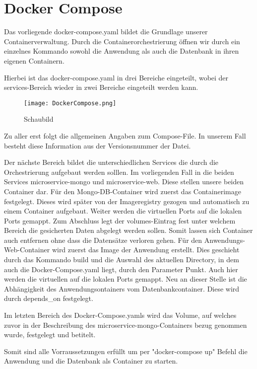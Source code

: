 
\chapter{Docker Compose}
\label{ch:Docker Compose}
Das vorliegende docker-compose.yaml bildet die Grundlage unserer Containerverwaltung. Durch die Containerorchestrierung öffnen wir durch ein einzelnes Kommando sowohl die Anwendung als auch die Datenbank in ihren eigenen Containern.

Hierbei ist das docker-compose.yaml in drei Bereiche eingeteilt, wobei der services-Bereich wieder in zwei Bereiche eingeteilt werden kann.

\begin{wrapfigure}{r}{0\textwidth}
\centering
\texttt{[image: DockerCompose.png]}
\vspace{3pt}
\caption{Schaubild\footnotemark}
\label{fig:blueant}
\end{wrapfigure}


Zu aller erst folgt die allgemeinen Angaben zum Compose-File. In unserem Fall besteht diese Information aus der Versionsnummer der Datei.

Der nächste Bereich bildet die unterschiedlichen Services die durch die Orchestrierung aufgebaut werden solllen. Im vorliegenden Fall in die beiden Services \glqq  microservice-mongo\grqq{} und \glqq  microservice-web\grqq{}. Diese stellen unsere beiden Container dar. 
Für den Mongo-DB-Container wird zuerst das Containerimage festgelegt. Dieses wird später von der Imageregistry gezogen und automatisch zu einem Container aufgebaut. Weiter werden die virtuellen Ports auf die lokalen Ports gemappt. Zum Abschluss legt der volumes-Eintrag fest unter welchem Bereich die gesicherten Daten abgelegt werden sollen. Somit lassen sich Container auch entfernen ohne dass die Datensätze verloren gehen.
Für den Anwendungs-Web-Container wird zuerst das Image der Anwendung erstellt. Dies geschieht durch das Kommando build und die Auswahl des aktuellen Directory, in dem auch die Docker-Compose.yaml liegt, durch den Parameter \glqq  Punkt\grqq{}. Auch hier werden die virtuellen auf die lokalen Ports gemappt. Neu an dieser Stelle ist die Abhängigkeit des Anwendungsontainers vom Datenbankcontainer. Diese wird durch \glqq  depends\_on\grqq{} festgelegt.

Im letzten Bereich des Docker-Compose.yamls wird das Volume, auf welches zuvor in der Beschreibung des \glqq  microservice-mongo\grqq{}-Containers bezug genommen wurde, festgelegt und betitelt.

Somit sind alle Vorraussetzungen erfüllt um per "docker-compose up" Befehl die Anwendung und die Datenbank als Container zu starten.
